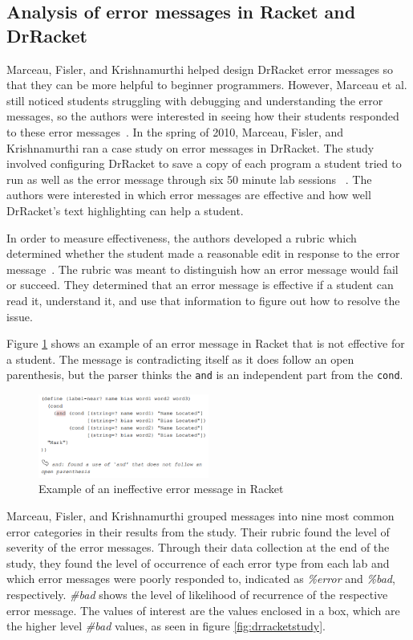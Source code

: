 \documentclass{sig-alternate}
\begin{document}
\subsection{Analysis of error messages in Racket and DrRacket}\label{racket analysis}
Marceau, Fisler, and Krishnamurthi helped design DrRacket error messages so that they can be more helpful to beginner programmers.
However, Marceau et al. still noticed students struggling with debugging and understanding the error messages, so the authors were interested in seeing how their students responded to these error messages~\cite{Marceau:2011:MYL:2048237.2048241}.
In the spring of 2010, Marceau, Fisler, and Krishnamurthi ran a case study on error messages in DrRacket.
The study involved configuring DrRacket to save a copy of each program a student tried to run as well as the error message through six 50 minute lab sessions ~\cite{Marceau:2011:MEE:1953163.1953308}.
The authors were interested in which error messages are effective and how well DrRacket's text highlighting can help a student.  

In order to measure effectiveness, the authors developed a rubric which determined whether the student made a reasonable edit in response to the error message~\cite{Marceau:2011:MEE:1953163.1953308}.
The rubric was meant to distinguish how an error message would fail or succeed.
They determined that an error message is effective if a student can read it, understand it, and use that information to figure out how to resolve the issue. 

Figure \ref{fig:racketerrormessage} shows an example of an error message in Racket that is not effective for a student.
The message is contradicting itself as it does follow an open parenthesis, but the parser thinks the \texttt{and} is an independent part from the \texttt{cond}.

\begin{figure}[t!]
  \centering
  \includegraphics[keepaspectratio, width=0.5\textwidth]{MEE_example.png}
  \caption{Example of an ineffective error message in Racket}
  \label{fig:racketerrormessage}
\end{figure}

Marceau, Fisler, and Krishnamurthi grouped messages into nine most common error categories in their results from the study.
Their rubric found the level of severity of the error messages.
Through their data collection at the end of the study, they found the level of occurrence of each error type from each lab and which error messages were poorly responded to, indicated as \textit{\%error} and \textit{\%bad}, respectively.
\textit{\#bad} shows the level of likelihood of recurrence of the respective error message.
The values of interest are the values enclosed in a box, which are the higher level \textit{\#bad} values, as seen in figure \ref{fig:drracketstudy}. 
\end{document}
